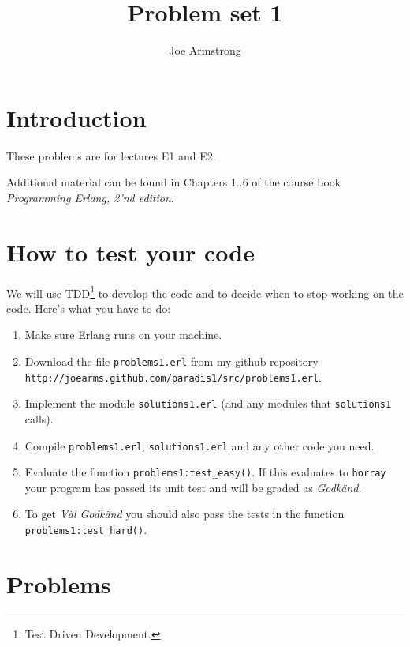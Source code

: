 \documentclass[12pt]{hitec}
\title{Problem set 1}
\author{Joe Armstrong}
\begin{document}
\maketitle

\tableofcontents

\section{Introduction}

These problems are for lectures E1 and E2.

Additional material can be found in Chapters 1..6 of
the course book {\sl Programming Erlang, 2'nd edition}. 

\section{How to test your code}

We will use TDD\footnote{Test Driven Development.} to develop the code
and to decide when to stop working on the code.
Here's what you have to do:

\begin{enumerate}
\item Make sure Erlang runs on your machine.

\item Download the file \verb+problems1.erl+ from my github repository
\newline
  \verb+http://joearms.github.com/paradis1/src/problems1.erl+.

\item Implement the module \verb+solutions1.erl+ (and any modules
that \verb+solutions1+ calls).

\item Compile \verb+problems1.erl+, \verb+solutions1.erl+ and
any other code you need.

\item Evaluate the function \verb+problems1:test_easy()+. If this
  evaluates to \verb+horray+ your program has passed
  its unit test and will be graded as {\sl Godk\"{a}nd}.

\item To get {\sl V\"{a}l Godk\"{a}nd} you should also pass the tests
  in the function \verb+problems1:test_hard()+.

\end{enumerate}

\section{Problems}
\end{document}
